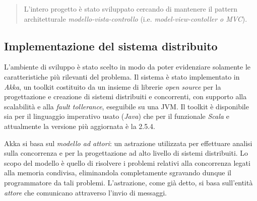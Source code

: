 \begin{quote}
L'intero progetto è stato sviluppato cercando di mantenere
il pattern architetturale \emph{modello-vista-controllo} (i.e. \emph{model-view-contoller o MVC}).
\end{quote}
\begin{figure}
\end{figure}

\subsection{Implementazione del sistema distribuito}
\label{sec:akka}
L'ambiente di sviluppo è stato scelto in modo da poter
evidenziare solamente le caratteristiche più rilevanti del problema.
Il sistema è stato implementato in \emph{Akka}, un toolkit costituito da un 
insieme di librerie \emph{open source} per la progettazione e creazione
di sistemi distribuiti e concorrenti, con supporto alla scalabilità e alla
\emph{fault tollerance}, eseguibile su una JVM.
Il toolkit è disponibile sia per il linguaggio imperativo usato (\emph{Java})
che per il funzionale \emph{Scala} e attualmente la versione più aggiornata 
è la 2.5.4.

Akka si basa sul \emph{modello ad attori}: un astrazione utilizzata per
effettuare analisi sulla concorrenza e per la progettazione ad alto livello
di sistemi distribuiti.
Lo scopo del modello è  quello di risolvere i problemi relativi alla concorrenza
legati alla memoria condivisa, eliminandola completamente sgravando dunque
il programmatore da tali problemi. L'astrazione, come già detto, si basa sull'entità
\emph{attore} che comunicano attraverso l'invio di messaggi.

